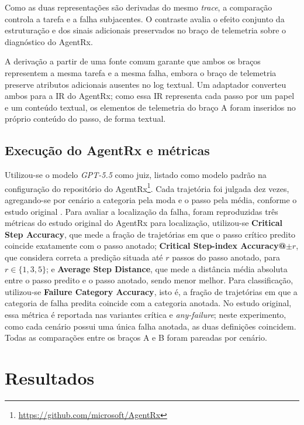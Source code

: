 \documentclass[sigconf]{acmart}
\begin{document}
Como as duas representações são derivadas do mesmo \textit{trace}, a comparação controla a tarefa e a falha
subjacentes. O contraste avalia o efeito conjunto da estruturação e dos sinais adicionais preservados no braço de
telemetria sobre o diagnóstico do AgentRx.

A derivação a partir de uma fonte comum garante que ambos os braços representem a mesma tarefa e a mesma falha, embora
o braço de telemetria preserve atributos adicionais ausentes no log textual. Um adaptador converteu ambos para a IR do
AgentRx; como essa IR representa cada passo por um papel e um conteúdo textual, os elementos de telemetria do braço A
foram inseridos no próprio conteúdo do passo, de forma textual.

\subsection{Execução do AgentRx e métricas}
\label{sebsec:agentrx-metricas}

Utilizou-se o modelo \textit{GPT-5.5} como juiz, listado como modelo padrão na configuração do repositório do
AgentRx\footnote{\url{https://github.com/microsoft/AgentRx}}. Cada trajetória foi julgada dez vezes, agregando-se por
cenário a categoria pela moda e o passo pela média, conforme o estudo original \cite{barke2026agentrx}. Para avaliar a
localização da falha, foram reproduzidas três métricas do estudo original do AgentRx para localização, utilizou-se
\textbf{Critical Step Accuracy}, que mede a fração de trajetórias em que o passo crítico predito coincide exatamente
com o passo anotado; \textbf{Critical Step-index Accuracy@$\pm r$}, que considera correta a predição situada até $r$
passos do passo anotado, para $r \in \{1,3,5\}$; e \textbf{Average Step Distance}, que mede a distância média absoluta
entre o passo predito e o passo anotado, sendo menor melhor. Para classificação, utilizou-se \textbf{Failure Category
	Accuracy}, isto é, a fração de trajetórias em que a categoria de falha predita coincide com a categoria anotada. No
estudo original, essa métrica é reportada nas variantes crítica e \textit{any-failure}; neste experimento, como cada
cenário possui uma única falha anotada, as duas definições coincidem. Todas as comparações entre os braços A e B foram
pareadas por cenário.

\section{Resultados}
\end{document}
